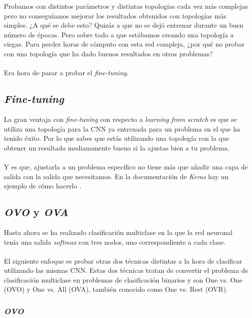 Probamos con distintos parámetros y distintas topologías cada vez más complejas pero no conseguíamos mejorar los resultados obtenidos con topologías más simples. ¿A qué se debe esto? Quizás a que no se dejó entrenar durante un buen número de épocas. Pero sobre todo a que estábamos creando una topología a ciegas. Para perder horas de cómputo con esta red compleja, ¿por qué no probar con una topología que ha dado buenos resultados en otros problemas?
\\ \\
Era hora de pasar a probar el \textit{fine-tuning}.

\subsection{\textit{Fine-tuning}}

La gran ventaja con \textit{fine-tuning} con respecto a \textit{learning from scratch} es que se utiliza una topología para la CNN ya entrenada para un problema en el que ha tenido éxito. Por lo que sabes que estás utilizando una topología con la que obtener un resultado medianamente bueno si la ajustas bien a tu problema.
\\ \\
Y es que, ajustarla a un problema específico no tiene más que añadir una capa de salida con la salida que necesitamos. En la documentación de \textit{Keras} hay un ejemplo de cómo hacerlo \cite{KerasApplications}.

\subsection{\textit{OVO} y \textit{OVA}}

Hasta ahora se ha realizado clasificación multiclase en la que la red neuronal tenía una salida \textit{softmax} con tres nodos, uno correspondiente a cada clase.
\\ \\
El siguiente enfoque es probar otras dos técnicas distintas a la hora de clasificar utilizando las mismas CNN. Estas dos técnicas tratan de convertir el problema de clasificación multiclase en problemas de clasificación binarios y son One vs. One (OVO) y One vs. All (OVA), también conocido como One vs. Rest (OVR).

\subsubsection{\textit{OVO}}

